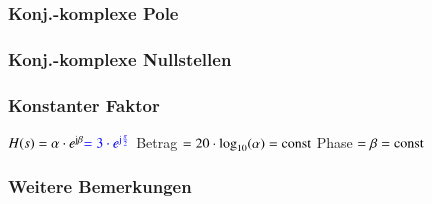 \begin{minipage}[t]{0.48\columnwidth}
    \subsubsection{Konj.-komplexe Pole}

    

\end{minipage}
\hfill
\begin{minipage}[t]{0.48\columnwidth}
    \subsubsection{Konj.-komplexe Nullstellen}

    

\end{minipage}



\begin{minipage}[t]{0.48\columnwidth}
    \subsubsection{Konstanter Faktor}

    \begin{outline}
        \1 $H(s) = \alpha \cdot e^{\mathrm{j} \beta} {\color{blue}= 3 \cdot e^{\mathrm{j} \frac{\pi}{2}}}$
            \2 Betrag $= 20 \cdot \log_{10}(\alpha) = \mathrm{const}$
            \2 Phase $= \beta = \mathrm{const}$
    \end{outline}
    
    
\end{minipage}
\hfill
\begin{minipage}[t]{0.48\columnwidth}
    \subsubsection{Weitere Bemerkungen}


\end{minipage}




